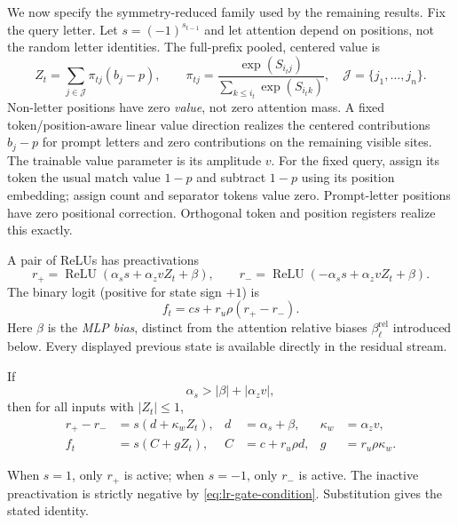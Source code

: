 We now specify the symmetry-reduced family used by the remaining results.
Fix the query letter. Let $s=(-1)^{s_{t-1}}$ and let attention depend on positions, not the
random letter identities.  The full-prefix pooled, centered value is
\begin{equation}\label{eq:lr-centered-value}
 Z_t=\sum_{j\in\mathcal J}\pi_{tj}(b_j-p),\qquad
 \pi_{tj}=\frac{\exp(S_{i_tj})}{\sum_{k\le i_t}\exp(S_{i_tk})},
 \quad \mathcal J=\{j_1,\ldots,j_n\}.
\end{equation}
Non-letter positions have zero \emph{value}, not zero attention mass.
A fixed token/position-aware linear value direction realizes the centered contributions
$b_j-p$ for prompt letters and zero contributions on the remaining visible
sites.  The trainable value parameter is its amplitude $v$. For the fixed query, assign its token the usual match
value $1-p$ and subtract $1-p$ using its position embedding; assign count
and separator tokens value zero. Prompt-letter positions have zero positional
correction. Orthogonal token and position registers realize this exactly.

A pair of ReLUs has preactivations
\begin{equation}\label{eq:lr-gates}
 r_+=\operatorname{ReLU}(\alpha_s s+\alpha_z vZ_t+\beta),\qquad
 r_-=\operatorname{ReLU}(-\alpha_s s+\alpha_z vZ_t+\beta).
\end{equation}
The binary logit (positive for state sign $+1$) is
\begin{equation}\label{eq:lr-factor-logit}
 f_t=cs+r_u\rho(r_+-r_-).
\end{equation}
Here $\beta$ is the \emph{MLP bias}, distinct from the attention
relative biases $\beta_\ell^{\mathrm{rel}}$ introduced below.
Every displayed previous state is available directly in the residual stream.

If
\begin{equation}\label{eq:lr-gate-condition}
 \alpha_s>|\beta|+|\alpha_z v|,
\end{equation}
then for all inputs with $|Z_t|\le1$,
\begin{equation}\label{eq:lr-feature-param}
 \begin{aligned}
 r_+-r_-&=s(d+\kappa_w Z_t),& d&=\alpha_s+\beta,& \kappa_w&=\alpha_z v,\\
 f_t&=s(C+gZ_t),& C&=c+r_u\rho d,& g&=r_u\rho \kappa_w.
 \end{aligned}
\end{equation}

When $s=1$, only $r_+$ is active; when $s=-1$, only $r_-$ is active.
The inactive preactivation is strictly negative by
\eqref{eq:lr-gate-condition}.  Substitution gives the stated identity.

